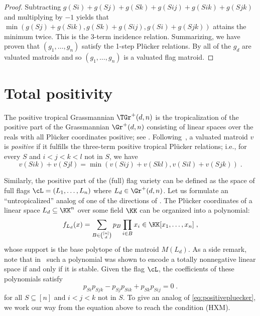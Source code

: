 \begin{proof}
	Subtracting $g(S {} i) + g(S {} j) + g(S {} k) + g(S {} ij) + g(S {} ik) + g(S {} jk)$ and multiplying by $-1$ yields that $\min(g(S {} j) + g(S {} ik), g(S {} k) + g(S {} ij), g(S {} i) + g(S {} jk))$
	attains the minimum twice.
	This is the 3-term incidence relation.
	Summarizing, we have proven that $(g_1,\dots,g_n)$ satisfy the 1-step Pl\"ucker relations.
	By  all of the $g_d$ are valuated matroids and so $(g_1,\dots,g_n)$ is a valuated flag matroid.
\end{proof}



\section{Total positivity} 
The positive tropical Grassmannian $\TGr^+(d,n)$ is the tropicalization of the positive part of the Grassmannian $\Gr^+(d,n)$ consisting of linear spaces over the reals with all Pl\"ucker coordinates positive; see \cite{SpeyerWilliams:2005,SpeyerWilliams:2021,ArkaniHamedLamSpradlin:2021}.
Following~\cite[Equation~(1.1)]{ArkaniHamedLamSpradlin:2021}, a valuated matroid $v$ is \emph{positive} if it fulfills the three-term positive tropical Pl\"ucker relations; i.e., for every $S$ and $i < j < k < l$ not in $S$, we have
\begin{equation} \tag{3TPR+} \label{eq:positivepluecker}
	v(Sik) + v(Sjl) = \min(v(Sij)+v(Skl), v(Sil)+v(Sjk)) \;.
\end{equation}

Similarly, the positive part of the (full) flag variety can be defined as the space of full flags $\cL=(L_1, \dots, L_n)$ where $L_d \in \Gr^+(d,n)$.
Let us formulate an \enquote{untropicalized} analog of one of the directions of .
The Pl\"ucker coordinates of a linear space $L_d\subseteq \KK^n $ over some field $\KK$ can be organized into a polynomial: 
\[
f_{L_d}(x) = \sum_{B\in \binom{[n]}{d}} p_B \prod_{i\in B} x_i \in \KK[x_1,\dots,x_n] \;,
\]
whose support is the base polytope of the matroid $M(L_d)$.
As a side remark, note that in~\cite{Purbhoo:2018} such a polynomial was shown to encode a totally nonnegative linear space if and only if it is stable. 
Given the flag $\cL$, the coefficients of these polynomials satisfy
\begin{equation} \label{eq:classical-incidence}
p_{Si}p_{Sjk} - p_{Sj}p_{Sik} + p_{Sk}p_{Sij} = 0 \;.
\end{equation}
for all $S\subseteq [n]$ and $i<j<k$ not in $S$.
To give an analog of \eqref{eq:positivepluecker}, we work our way from the equation above to reach the condition (HXM).

